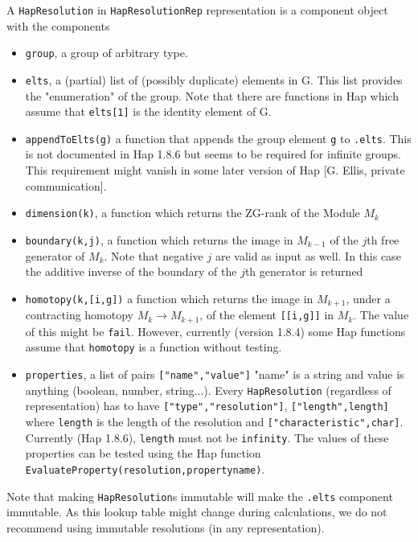 \documentclass[a4paper,11pt]{report}
\begin{document}
{{ A \texttt{HapResolution} in \texttt{HapResolutionRep} representation is a component object with the components 
\begin{itemize}
\item \texttt{group}, a group of arbitrary type.
\item \texttt{elts}, a (partial) list of (possibly duplicate) elements in G. This list provides
the "enumeration" of the group. Note that there are functions in Hap which
assume that \texttt{elts[1]} is the identity element of G. 
\item \texttt{appendToElts(g)} a function that appends the group element \texttt{g} to \texttt{.elts}. This is not documented in Hap 1.8.6 but seems to be required for infinite
groups. This requirement might vanish in some later version of Hap [G. Ellis,
private communication]. 
\item \texttt{dimension(k)}, a function which returns the ZG-rank of the Module $M_k$
\item \texttt{boundary(k,j)}, a function which returns the image in $M_{k-1}$ of the $j$th free generator of $M_k$. Note that negative $j$ are valid as input as well. In this case the additive inverse of the boundary
of the $j$th generator is returned
\item \texttt{homotopy(k,[i,g])} a function which returns the image in $M_{k+1}$, under a contracting homotopy $M_k \to M_{k+1}$, of the element \texttt{[[i,g]]} in $M_k$. The value of this might be \texttt{fail}. However, currently (version 1.8.4) some Hap functions assume that \texttt{homotopy} is a function without testing.
\item \texttt{properties}, a list of pairs \texttt{["name","value"]} "name" is a string and value is anything (boolean, number, string...). Every \texttt{HapResolution} (regardless of representation) has to have \texttt{["type","resolution"]}, \texttt{["length",length]} where \texttt{length} is the length of the resolution and \texttt{["characteristic",char]}. Currently (Hap 1.8.6), \texttt{length} must not be \texttt{infinity}. The values of these properties can be tested using the Hap function \texttt{EvaluateProperty(resolution,propertyname)}.
\end{itemize}
 Note that making \texttt{HapResolution}s immutable will make the \texttt{.elts} component immutable. As this lookup table might change during calculations, we
do not recommend using immutable resolutions (in any representation). }

 
}
\end{document}
